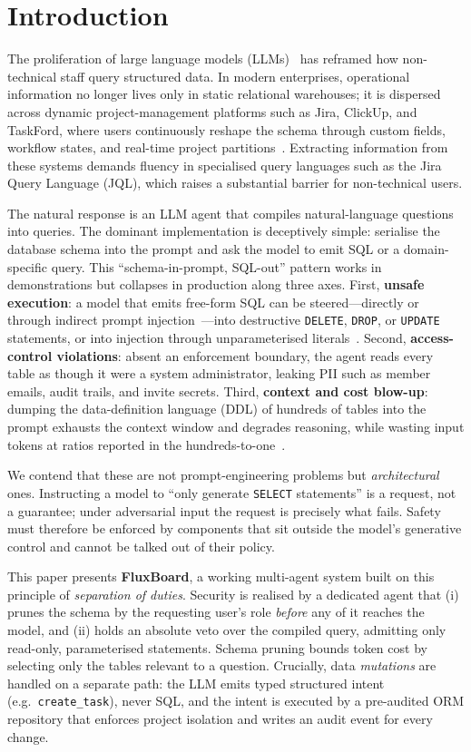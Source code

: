 \documentclass[runningheads]{llncs}
\begin{document}
\section{Introduction}
The proliferation of large language models (LLMs)~\cite{vaswani2017attention,brown2020gpt3} has reframed how non-technical staff query structured data. In modern enterprises, operational information no longer lives only in static relational warehouses; it is dispersed across dynamic project-management platforms such as Jira, ClickUp, and TaskFord, where users continuously reshape the schema through custom fields, workflow states, and real-time project partitions~\cite{jackal}. Extracting information from these systems demands fluency in specialised query languages such as the Jira Query Language (JQL), which raises a substantial barrier for non-technical users.

The natural response is an LLM agent that compiles natural-language questions into queries. The dominant implementation is deceptively simple: serialise the database schema into the prompt and ask the model to emit SQL or a domain-specific query. This ``schema-in-prompt, SQL-out'' pattern works in demonstrations but collapses in production along three axes. First, \textbf{unsafe execution}: a model that emits free-form SQL can be steered---directly or through indirect prompt injection~\cite{greshake2023injection}---into destructive \texttt{DELETE}, \texttt{DROP}, or \texttt{UPDATE} statements, or into injection through unparameterised literals~\cite{rietta}. Second, \textbf{access-control violations}: absent an enforcement boundary, the agent reads every table as though it were a system administrator, leaking PII such as member emails, audit trails, and invite secrets. Third, \textbf{context and cost blow-up}: dumping the data-definition language (DDL) of hundreds of tables into the prompt exhausts the context window and degrades reasoning, while wasting input tokens at ratios reported in the hundreds-to-one~\cite{puppygraph}.

We contend that these are not prompt-engineering problems but \emph{architectural} ones. Instructing a model to ``only generate \texttt{SELECT} statements'' is a request, not a guarantee; under adversarial input the request is precisely what fails. Safety must therefore be enforced by components that sit outside the model's generative control and cannot be talked out of their policy.

This paper presents \textbf{FluxBoard}, a working multi-agent system built on this principle of \emph{separation of duties}. Security is realised by a dedicated agent that (i) prunes the schema by the requesting user's role \emph{before} any of it reaches the model, and (ii) holds an absolute veto over the compiled query, admitting only read-only, parameterised statements. Schema pruning bounds token cost by selecting only the tables relevant to a question. Crucially, data \emph{mutations} are handled on a separate path: the LLM emits typed structured intent (e.g.\ \texttt{create\_task}), never SQL, and the intent is executed by a pre-audited ORM repository that enforces project isolation and writes an audit event for every change.
\end{document}
